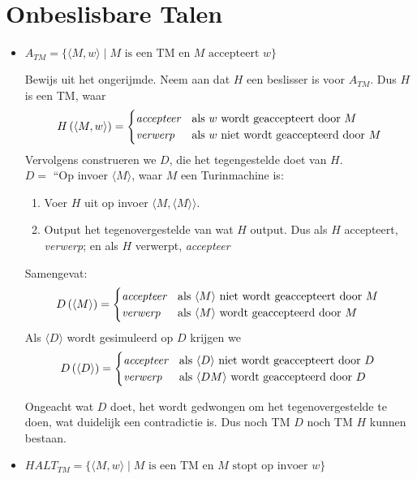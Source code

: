 \documentclass[]{article}
\begin{document}
\section*{Onbeslisbare Talen}
\begin{itemize}
	\item $A_{TM} = \{ \langle M, w \rangle \mid M \mbox{ is een TM en $M$ accepteert $w$}\}$
	
	Bewijs uit het ongerijmde.
	Neem aan dat $H$ een beslisser is voor $A_{TM}$. Dus $H$ is een TM, waar
	$$H\left( \langle M, w \rangle \right) = \begin{cases}\emph{accepteer} & \mbox{als $w$ wordt geaccepteert door $M$ } \\ \emph{verwerp} & \mbox{als $w$ niet wordt geaccepteerd door $M$}  \end{cases}$$
	Vervolgens construeren we $D$, die het tegengestelde doet van $H$.\\
	$D = $ ``Op invoer $\langle M \rangle$, waar $M$ een Turinmachine is: 
	\begin{enumerate}
		\item Voer $H$ uit op invoer $\langle M, \langle M \rangle \rangle$.
		\item Output het tegenovergestelde van wat $H$ output. Dus als $H$ accepteert, \emph{verwerp}; en als $H$ verwerpt, \emph{accepteer}
	\end{enumerate}
	Samengevat:
	$$D\left( \langle M \rangle \right) = \begin{cases}\emph{accepteer} & \mbox{als $\langle M \rangle$ niet wordt geaccepteert door $M$ } \\ \emph{verwerp} & \mbox{als $\langle M \rangle$ wordt geaccepteerd door $M$}  \end{cases}$$
	Als $\langle D \rangle$ wordt gesimuleerd op $D$ krijgen we
	$$D\left( \langle D \rangle \right) = \begin{cases}\emph{accepteer} & \mbox{als $\langle D \rangle$ niet wordt geaccepteert door $D$ } \\ \emph{verwerp} & \mbox{als $\langle DM \rangle$ wordt geaccepteerd door $D$}  \end{cases}$$
	
	Ongeacht wat $D$ doet, het wordt gedwongen om het tegenovergestelde te doen, wat duidelijk een contradictie is. Dus noch TM $D$ noch TM $H$ kunnen bestaan.
	
	\item $HALT_{TM} = \{ \langle M, w \rangle \mid M \mbox{ is een TM en $M$ stopt op invoer $w$}\}$
	

\end{itemize}
\end{document}
